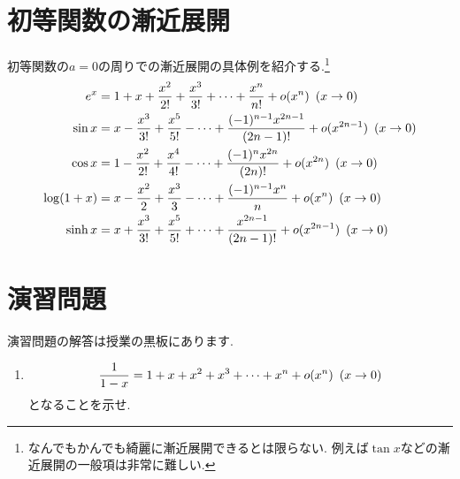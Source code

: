 \documentclass[dvipdfmx,a4paper,11pt]{article}
\theoremstyle{definition}
\begin{document}
 \section{初等関数の漸近展開}

 初等関数の$a=0$の周りでの漸近展開の具体例を紹介する.\footnote{なんでもかんでも綺麗に漸近展開できるとは限らない. 例えば$\tan x$などの漸近展開の一般項は非常に難しい.}
\begin{align*}
\begin{split}
e^x &= 1 + x+  \frac{x^2}{2!} + \frac{x^3}{3!}  + \cdots  + 
 \frac{ x^{n}}{n!} + o(x^{n}) \text{\,\,\,}(x \rightarrow 0) \\
\sin x &= x - \frac{x^3}{3!} + \frac{x^5}{5!} - \cdots  + 
 \frac{(-1)^{n-1} x^{2n-1}}{(2n-1)!} 
 + o(x^{2n-1}) \text{\,\,\,}(x \rightarrow 0) \\
 \cos x &= 1 - \frac{x^2}{2!} + \frac{x^4}{4!} - \cdots  + 
 \frac{(-1)^{n} x^{2n}}{(2n)!} 
 + o(x^{2n}) \text{\,\,\,}(x \rightarrow 0) \\
 \log(1+x) &= x - \frac{x^2}{2} + \frac{x^3}{3}  - \cdots   
 + \frac{ (-1)^{n-1}x^{n}}{n} + o(x^{n}) \text{\,\,\,}(x \rightarrow 0) \\
  \sinh x &= x + \frac{x^3}{3!} + \frac{x^5}{5!} + \cdots  + 
 \frac{x^{2n-1}}{(2n-1)!} 
 + o(x^{2n-1}) \text{\,\,\,}(x \rightarrow 0) \\
\end{split}
\end{align*}

 
\section{演習問題}
演習問題の解答は授業の黒板にあります.
\begin{enumerate}
\item 
$$
\frac{1}{1-x} = 1 + x+  x^2 + x^3  + \cdots   
 + x^{n} + o(x^{n}) \text{\,\,\,}(x \rightarrow 0) 
$$
となることを示せ.

\end{enumerate}



 
\end{document}
